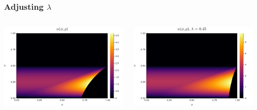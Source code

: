 \documentclass{beamer}
\begin{document}
\begin{frame}
    \frametitle{Adjusting $\lambda$}
    \begin{columns}
        \hspace{-1 cm}\begin{column}{0.5\textwidth}
            \includegraphics[scale=0.3]{vanilla.png}
        \end{column}
        \begin{column}{0.5\textwidth}
            \includegraphics[scale=0.3]{small_lambda.png}
        \end{column}
    \end{columns}
\end{frame}
\end{document}
